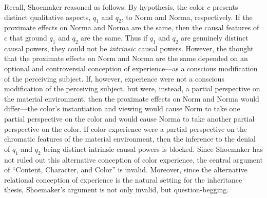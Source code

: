 \documentclass[12pt]{article}
\begin{document}

Recall, Shoemaker reasoned as follows: By hypothesis, the color \(c\) presents distinct qualitative aspects, \(q_1\) and \(q_2\), to Norm and Norma, respectively. If the proximate effects on Norma and Norma are the same, then the causal features of \(c\) that ground \(q_1\) and \(q_2\) are the same. Thus if \(q_1\) and \(q_2\) are genuinely distinct causal powers, they could not be \emph{intrinsic} causal powers. However, the thought that the proximate effects on Norm and Norma are the same depended on an optional and controversial conception of experience---as a conscious modification of the perceiving subject. If, however, experience were not a conscious modification of the perceiving subject, but were, instead, a partial perspective on the material environment, then the proximate effects on Norm and Norma would differ---the color's instantiation and viewing would cause Norm to take one partial perspective on the color and would cause Norma to take another partial perspective on the color. If color experience were a partial perspective on the chromatic features of the material environment, then the inference to the denial of \(q_1\) and \(q_2\) being distinct intrinsic causal powers is blocked. Since Shoemaker has not ruled out this alternative conception of color experience, the central argument of ``Content, Character, and Color'' is invalid. Moreover, since the alternative relational conception of experience is the natural setting for the inheritance thesis, Shoemaker's argument is not only invalid, but question-begging.
\end{document}
